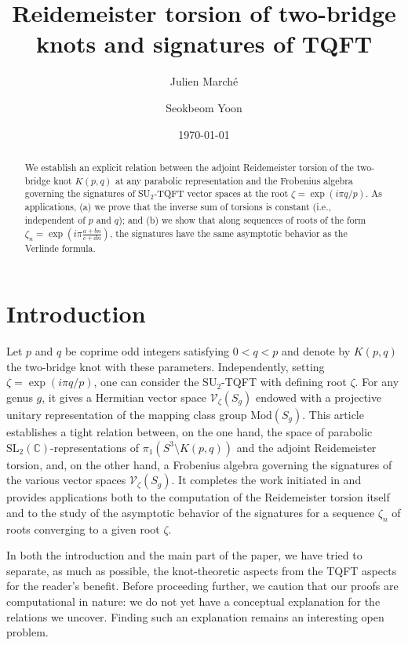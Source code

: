 \documentclass{amsart}
\title{Reidemeister torsion of two-bridge knots and signatures of TQFT}
\author{Julien March\'{e}}
\author{Seokbeom Yoon}
\date{\today}
\newcommand{\C}{\mathbb{C}}
\newcommand{\SL}{\mathrm{SL}}
\newcommand{\calV}{\mathcal{V}}
\newcommand{\Mod}{\mathrm{Mod}}
\newcommand{\SU}{\mathrm{SU}}
\theoremstyle{definition}
\begin{document}
\begin{abstract}
We establish an explicit relation between the adjoint Reidemeister torsion of the two-bridge knot $K(p,q)$ at any parabolic representation and the Frobenius algebra governing the signatures of SU$_2$-TQFT vector spaces at the root $\zeta=\exp(i\pi q/p)$. As applications, (a) we prove that the inverse sum of torsions is constant (i.e., independent of $p$ and $q$); and (b) we show that along sequences of roots of the form 
$\zeta_n = \exp\left(i\pi\tfrac{a+bn}{c+dn}\right)$, 
the signatures have the same asymptotic behavior as the Verlinde formula. 
\end{abstract}
\maketitle

\tableofcontents

\section{Introduction}

Let $p$ and $q$ be coprime odd integers satisfying $0<q<p$ and denote by $K(p,q)$ the two-bridge knot with these parameters. Independently, setting $\zeta=\exp(i \pi q/p)$, one can consider the $\SU_2$-TQFT with defining root $\zeta$. For any genus $g$, it gives a Hermitian vector space $\calV_\zeta(S_g)$ endowed with a projective unitary representation of the mapping class group $\Mod(S_g)$. This article establishes a tight relation between, on the one hand, the space of parabolic $\SL_2(\C)$-representations of $\pi_1(S^3\setminus K(p,q))$ and the adjoint Reidemeister torsion, and, on the other hand, a Frobenius algebra governing the signatures of the various vector spaces $\calV_\zeta(S_g)$. It completes the work initiated in \cite{S2P} and provides applications both to the computation of the Reidemeister torsion itself and to the study of the asymptotic behavior of the signatures for a sequence $\zeta_n$ of roots converging to a given root $\zeta$. 

In both the introduction and the main part of the paper, we have tried to separate, as much as possible, the knot-theoretic aspects from the TQFT aspects for the reader’s benefit. Before proceeding further, we caution that our proofs are computational in nature: we do not yet have a conceptual explanation for the relations we uncover. Finding such an explanation remains an interesting open problem.
\end{document}
